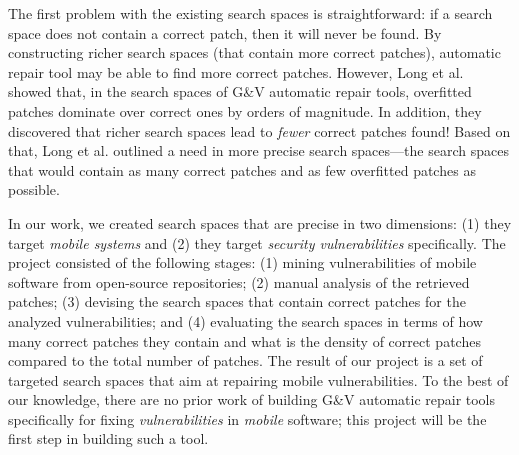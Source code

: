 The first problem with the existing search spaces is straightforward: if a search space does not contain a correct patch, then it will never be found.
By constructing richer search spaces (that contain more correct patches), automatic repair tool may be able to find more correct patches.
However, Long et al.~\cite{long2016analysis} showed that, in the search spaces of G\&V automatic repair tools, overfitted patches dominate over correct ones by orders of magnitude.
In addition, they discovered that richer search spaces lead to \emph{fewer} correct patches found!
Based on that, Long et al. outlined a need in more precise search spaces---the search spaces that would contain as many correct patches and as few overfitted patches as possible.

In our work, we created search spaces that are precise in two dimensions: (1) they target \emph{mobile systems} and (2) they target \emph{security vulnerabilities} specifically.
The project consisted of the following stages:
(1) mining vulnerabilities of mobile software from open-source repositories;
(2) manual analysis of the retrieved patches;
(3) devising the search spaces that contain correct patches for the analyzed vulnerabilities; and 
(4) evaluating the search spaces in terms of how many correct patches they contain and what is the density of correct patches compared to the total number of patches.
The result of our project is a set of targeted search spaces that aim at repairing mobile vulnerabilities.
To the best of our knowledge, there are no prior work of building G\&V automatic repair tools specifically for fixing \emph{vulnerabilities} in \emph{mobile} software; this project will be the first step in building such a tool.
